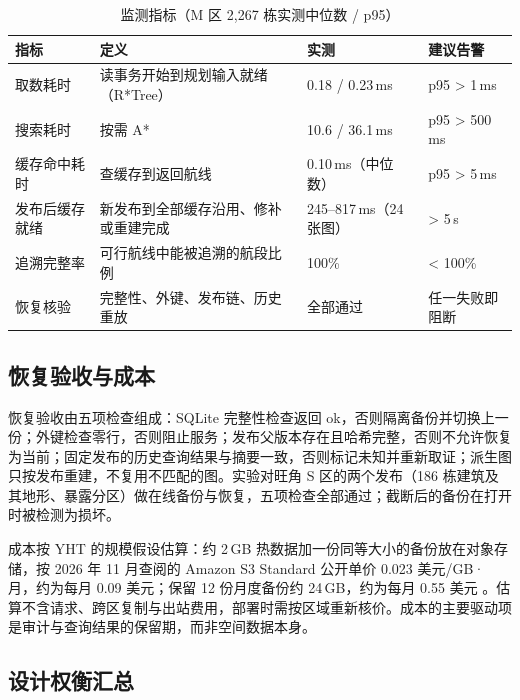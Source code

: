 \documentclass[a4paper,11pt,UTF8]{ctexart}
\begin{document}
\begin{table}[!htbp]\centering\small
\caption{监测指标（M 区 2,267 栋实测中位数 / p95）}
\begin{tabularx}{\textwidth}{L{2.6cm}YL{2.4cm}L{3.6cm}}
\toprule
指标 & 定义 & 实测 & 建议告警 \\
\midrule
取数耗时 & 读事务开始到规划输入就绪（R*Tree） & 0.18 / 0.23\,ms & p95 > 1\,ms \\
搜索耗时 & 按需 A* & 10.6 / 36.1\,ms & p95 > 500\,ms \\
缓存命中耗时 & 查缓存到返回航线 & 0.10\,ms（中位数） & p95 > 5\,ms \\
发布后缓存就绪 & 新发布到全部缓存沿用、修补或重建完成 & 245–817\,ms（24 张图） & > 5\,s \\
追溯完整率 & 可行航线中能被追溯的航段比例 & 100\% & < 100\% \\
恢复核验 & 完整性、外键、发布链、历史重放 & 全部通过 & 任一失败即阻断 \\
\bottomrule
\end{tabularx}
\end{table}

\subsection{恢复验收与成本}

恢复验收由五项检查组成：SQLite 完整性检查返回 ok，否则隔离备份并切换上一份；外键检查零行，否则阻止服务；发布父版本存在且哈希完整，否则不允许恢复为当前；固定发布的历史查询结果与摘要一致，否则标记未知并重新取证；派生图只按发布重建，不复用不匹配的图。实验对旺角 S 区的两个发布（186 栋建筑及其地形、暴露分区）做在线备份与恢复，五项检查全部通过；截断后的备份在打开时被检测为损坏。

成本按 YHT 的规模假设估算：约 2\,GB 热数据加一份同等大小的备份放在对象存储，按 2026 年 11 月查阅的 Amazon S3 Standard 公开单价 0.023 美元/GB·月，约为每月 0.09 美元；保留 12 份月度备份约 24\,GB，约为每月 0.55 美元 \cite{s3}。估算不含请求、跨区复制与出站费用，部署时需按区域重新核价。成本的主要驱动项是审计与查询结果的保留期，而非空间数据本身。

\subsection{设计权衡汇总}
\end{document}

